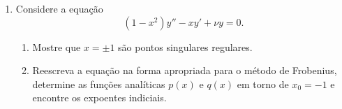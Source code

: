 \begin{enumerate}
	\item Considere a equação
	      $$
		      (1-x^2)y'' - xy' + \nu y = 0.
	      $$
	      \begin{enumerate}
		      \item Mostre que $x=\pm1$ são pontos singulares regulares.
		      \item Reescreva a equação na forma apropriada para o método de
		            Frobenius, determine as funções analíticas $p(x)$ e $q(x)$ em
		            torno de $x_0=-1$ e encontre os expoentes indiciais.
	      \end{enumerate}

\end{enumerate}


